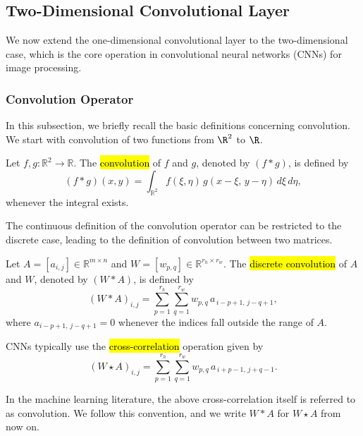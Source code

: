 \subsection{Two-Dimensional Convolutional Layer}
We now extend the one-dimensional convolutional layer to the two-dimensional case,
which is the core operation in convolutional neural networks (CNNs) for image processing.
\subsubsection{Convolution Operator}
In this subsection, we briefly recall the basic definitions concerning convolution. We start with convolution of two functions from $\R^2$ to $\R$.
\begin{definition}

Let $f, g : \mathbb{R}^2 \to \mathbb{R}$. The \hl{convolution} of $f$ and $g$, denoted by $(f * g)$, is defined by
$$
(f * g)(x, y)
= \int_{\mathbb{R}^2} f(\xi, \eta)\, g(x - \xi,\, y - \eta)\, d\xi\, d\eta,
$$
whenever the integral exists. 
\end{definition}
The continuous definition of the convolution operator can be restricted to the discrete case, leading to the definition of convolution between two matrices.
\begin{definition}

Let $A = [a_{i,j}] \in \mathbb{R}^{m \times n}$ and $W = [w_{p,q}] \in \mathbb{R}^{r_h \times r_w}$. 
The \hl{discrete convolution} of $A$ and $W$, denoted by $(W * A)$, is defined by
$$
(W * A)_{i,j}
= \sum_{p=1}^{r_h} \sum_{q=1}^{r_w}
w_{p,q}\, a_{\,i - p + 1,\, j - q + 1},
$$
where $a_{i - p + 1,\, j - q + 1} = 0$ whenever the indices fall outside the range of $A$.
\end{definition}
CNNs typically use the \hl{cross-correlation} operation given by
$$
(W \star A)_{i,j}
= \sum_{p=1}^{r_h} \sum_{q=1}^{r_w}
w_{p,q}\, a_{\,i + p - 1,\, j + q - 1}.
$$
\begin{note}
In the machine learning literature, the above cross-correlation itself is referred to as convolution. We follow this convention, and we write $W * A$ for $W \star A$ from now on.
\end{note}

